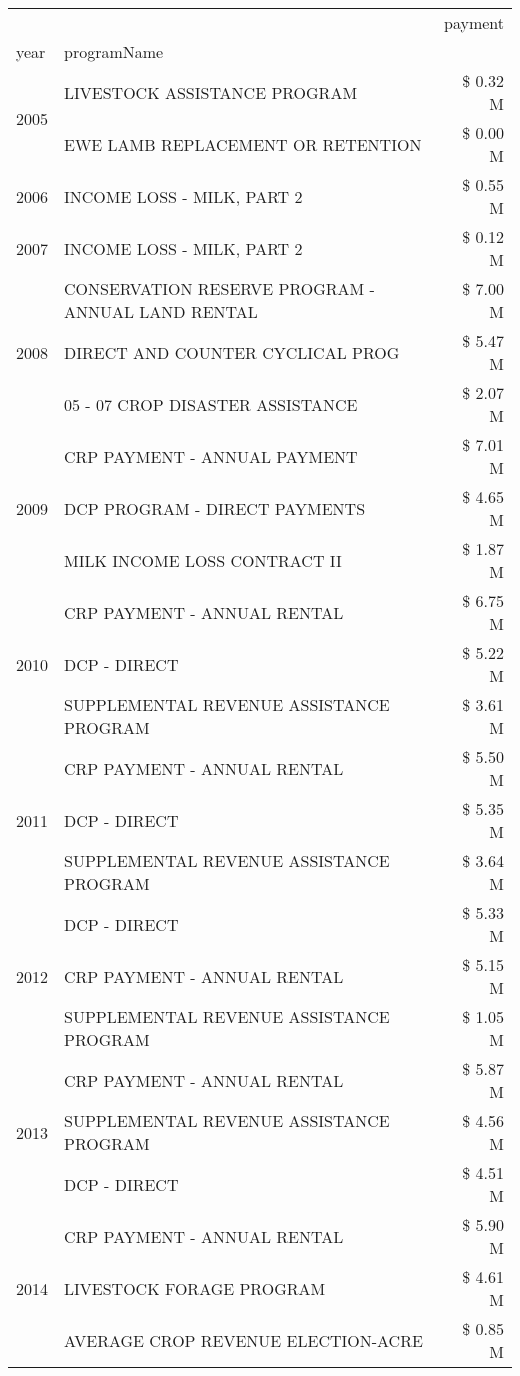 \begin{tabular}{llr}
\toprule
 &  & payment \\
year & programName &  \\
\midrule
\multirow[t]{2}{*}{2005} & LIVESTOCK ASSISTANCE PROGRAM & \$ 0.32 M \\
 & EWE LAMB REPLACEMENT OR RETENTION & \$ 0.00 M \\
\cline{1-3}
2006 & INCOME LOSS - MILK, PART 2 & \$ 0.55 M \\
\cline{1-3}
2007 & INCOME LOSS - MILK, PART 2 & \$ 0.12 M \\
\cline{1-3}
\multirow[t]{3}{*}{2008} & CONSERVATION RESERVE PROGRAM - ANNUAL LAND RENTAL & \$ 7.00 M \\
 & DIRECT AND COUNTER CYCLICAL PROG & \$ 5.47 M \\
 & 05 - 07 CROP DISASTER ASSISTANCE & \$ 2.07 M \\
\cline{1-3}
\multirow[t]{3}{*}{2009} & CRP PAYMENT - ANNUAL PAYMENT & \$ 7.01 M \\
 & DCP PROGRAM - DIRECT PAYMENTS & \$ 4.65 M \\
 & MILK INCOME LOSS CONTRACT II & \$ 1.87 M \\
\cline{1-3}
\multirow[t]{3}{*}{2010} & CRP PAYMENT - ANNUAL RENTAL & \$ 6.75 M \\
 & DCP - DIRECT & \$ 5.22 M \\
 & SUPPLEMENTAL REVENUE ASSISTANCE PROGRAM & \$ 3.61 M \\
\cline{1-3}
\multirow[t]{3}{*}{2011} & CRP PAYMENT - ANNUAL RENTAL & \$ 5.50 M \\
 & DCP - DIRECT & \$ 5.35 M \\
 & SUPPLEMENTAL REVENUE ASSISTANCE PROGRAM & \$ 3.64 M \\
\cline{1-3}
\multirow[t]{3}{*}{2012} & DCP - DIRECT & \$ 5.33 M \\
 & CRP PAYMENT - ANNUAL RENTAL & \$ 5.15 M \\
 & SUPPLEMENTAL REVENUE ASSISTANCE PROGRAM & \$ 1.05 M \\
\cline{1-3}
\multirow[t]{3}{*}{2013} & CRP PAYMENT - ANNUAL RENTAL & \$ 5.87 M \\
 & SUPPLEMENTAL REVENUE ASSISTANCE PROGRAM & \$ 4.56 M \\
 & DCP - DIRECT & \$ 4.51 M \\
\cline{1-3}
\multirow[t]{3}{*}{2014} & CRP PAYMENT - ANNUAL RENTAL & \$ 5.90 M \\
 & LIVESTOCK FORAGE PROGRAM & \$ 4.61 M \\
 & AVERAGE CROP REVENUE ELECTION-ACRE & \$ 0.85 M \\

\end{tabular}
